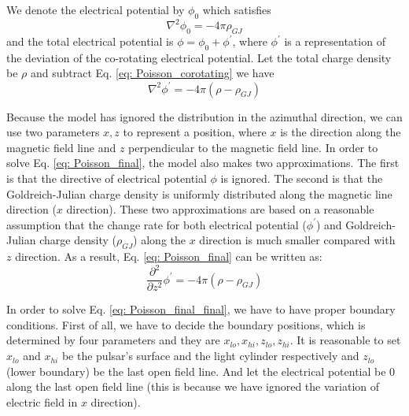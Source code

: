 \documentclass[12pt]{report}
\newcommand{\gj}[0]{
  Goldreich-Julian charge density
}
\begin{document}
        We denote the electrical potential by $\phi_{0}$ which satisfies 
        \begin{equation}
          \label{eq: Poisson_corotating}
          \nabla^{2}\phi_{0} = -4\pi\rho_{GJ}
        \end{equation}
        and the total electrical potential is $\phi = \phi_{0} + \phi^{\prime}$, where $\phi^{\prime}$ is a 
        representation of the deviation of the co-rotating electrical potential.  
        Let the total charge density be $\rho$ and subtract Eq. \ref{eq: Poisson_corotating} we have 
        \begin{equation}
          \label{eq: Poisson_final}
          \nabla^{2}\phi^{\prime} = -4\pi\left(\rho - \rho_{GJ} \right)
        \end{equation}

      Because the model has ignored the distribution in the azimuthal direction, we can use two parameters 
      $x, z$ to represent a position, where $x$ is the direction along the magnetic field line and $z$  
      perpendicular to the magnetic field line. In order to solve Eq. \ref{eq: Poisson_final}, 
      the model also makes two approximations. The first is that the directive of electrical potential $\phi$ 
      is ignored. The second is that the \gj{} is uniformly distributed along the magnetic line direction 
      ($x$ direction). These two approximations are based on a reasonable assumption that the change rate 
      for both electrical potential ($\phi^{\prime}$) and \gj{}($\rho_{GJ}$) along the $x$ direction is much 
      smaller compared with $z$ direction. 
      As a result, Eq. \ref{eq: Poisson_final} can be written as: 
      \begin{equation}
        \label{eq: Poisson_final_final}
        \frac{\partial^2}{\partial z^2} \phi^{\prime} = -4\pi\left(\rho - \rho_{GJ} \right)
      \end{equation}

      In order to solve Eq. \ref{eq: Poisson_final_final}, we have to have proper boundary conditions. 
      First of all, we have to decide the boundary positions, which is determined by four parameters and they are  
      $x_{lo}, x_{hi}, z_{lo}, z_{hi}$. It is reasonable to set $x_{lo}$ and $x_{hi}$
      be the pulsar's surface and the light cylinder respectively and $z_{lo}$ (lower boundary) be the last open 
      field line. And let the electrical potential be $0$ along the last open field line (this is because we have 
      ignored the variation of electric field in $x$ direction).   
\end{document}
